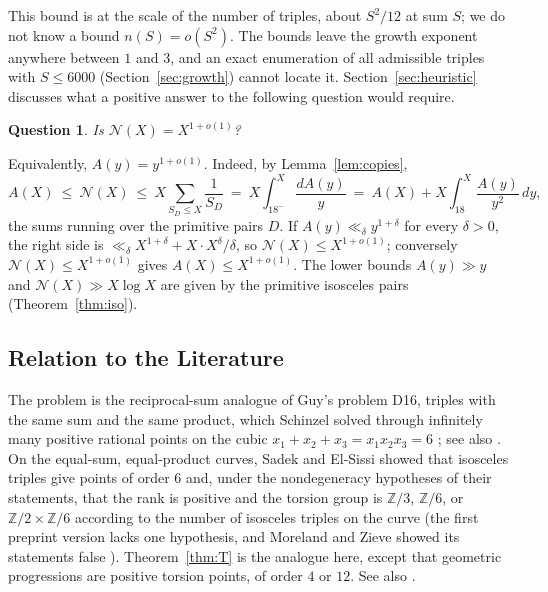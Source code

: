 \documentclass[10pt]{article}
\newcommand{\Z}{\mathbb{Z}}
\newcommand{\N}{\mathcal{N}}
\newtheorem{introquestion}[introthm]{Question}
\begin{document}
This bound is at the scale of the number of triples, about $S^2/12$ at sum $S$; we do not know a bound $n(S)=o(S^2)$. The bounds leave the growth exponent anywhere between $1$ and $3$, and an exact enumeration of all admissible triples with $S\le6000$ (Section~\ref{sec:growth}) cannot locate it. Section~\ref{sec:heuristic} discusses what a positive answer to the following question would require.

\begin{introquestion}\label{q:intro}
Is $\N(X)=X^{1+o(1)}$?
\end{introquestion}

Equivalently, $A(y)=y^{1+o(1)}$. Indeed, by Lemma~\ref{lem:copies},
\[
  A(X)\ \le\ \N(X)\ \le\ X\sum_{S_D\le X}\frac1{S_D}\ =\ X\int_{18^-}^X\frac{dA(y)}y\ =\ A(X)+X\int_{18}^X\frac{A(y)}{y^2}\,dy ,
\]
the sums running over the primitive pairs $D$. If $A(y)\ll_\delta y^{1+\delta}$ for every $\delta>0$, the right side is $\ll_\delta X^{1+\delta}+X\cdot X^\delta/\delta$, so $\N(X)\le X^{1+o(1)}$; conversely $\N(X)\le X^{1+o(1)}$ gives $A(X)\le X^{1+o(1)}$. The lower bounds $A(y)\gg y$ and $\N(X)\gg X\log X$ are given by the primitive isosceles pairs (Theorem~\ref{thm:iso}).

\subsection{Relation to the Literature}
The problem is the reciprocal-sum analogue of Guy's problem D16, triples with the same sum and the same product, which Schinzel solved through infinitely many positive rational points on the cubic $x_1+x_2+x_3=x_1x_2x_3=6$ \cite{schinzel1996}; see also \cite{kelly1989,zhangcai2013,bremnerguy1997}. On the equal-sum, equal-product curves, Sadek and El-Sissi showed that isosceles triples give points of order $6$ \cite[Proposition~2.5]{sadekelsissi2015} and, under the nondegeneracy hypotheses of their statements, that the rank is positive and the torsion group is $\Z/3$, $\Z/6$, or $\Z/2\times\Z/6$ according to the number of isosceles triples on the curve \cite[Proposition~2.7 and Theorem~2.8]{sadekelsissi2015} (the first preprint version lacks one hypothesis, and Moreland and Zieve showed its statements false \cite{morelandzieve2013}). Theorem~\ref{thm:T} is the analogue here, except that geometric progressions are positive torsion points, of order $4$ or $12$. See also \cite{cha2019,ysv2024}.
\end{document}
